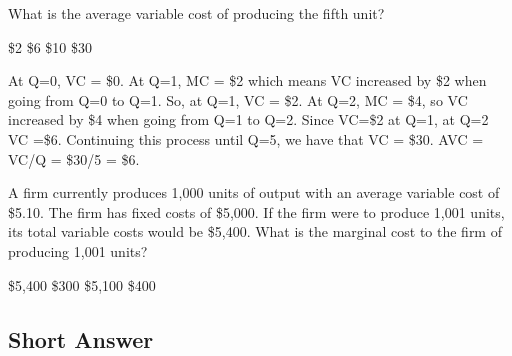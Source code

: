 \documentclass[addpoints,11pt]{exam}
\theoremstyle{definition}
\newcommand{\dd}[1]{}
\begin{document}
\begin{questions}
		What is the average variable cost of producing the fifth unit?
		
		\begin{choices}
			\choice \$2
			\CorrectChoice \$6
			\choice \$10
			\choice \$30
		\end{choices}
		
		\begin{solution}
			At Q=0, VC = \$0. At Q=1, MC = \$2 which means VC increased by \$2 when going from Q=0 to Q=1. So, at Q=1, VC = \$2. At Q=2, MC = \$4, so VC increased by \$4 when going from Q=1 to Q=2. Since VC=\$2 at Q=1, at Q=2 VC =\$6. Continuing this process until Q=5, we have that VC = \$30. AVC = VC/Q = \$30/5 = \$6.
		\end{solution}
		
			\question A firm currently produces 1,000 units of output with an average variable cost of \$5.10. The firm has fixed costs of \$5,000. If the firm were to produce 1,001 units, its total variable costs would be \$5,400. What is the marginal cost to the firm of producing 1,001 units?
			
			\begin{choices}
				\choice \$5,400
				\CorrectChoice \$300
				\choice \$5,100
				\choice \$400
			\end{choices}
				
	\dd{At 1,000 units, $VC = 1,000 \times 5.10 = \$5,100.$ $MC = \frac{\Delta VC}{\Delta Q} = \frac{(5,400 - 5,100)}{1} = \$300.$}
		
\end{questions}

\subsection*{Short Answer}
\end{document}
